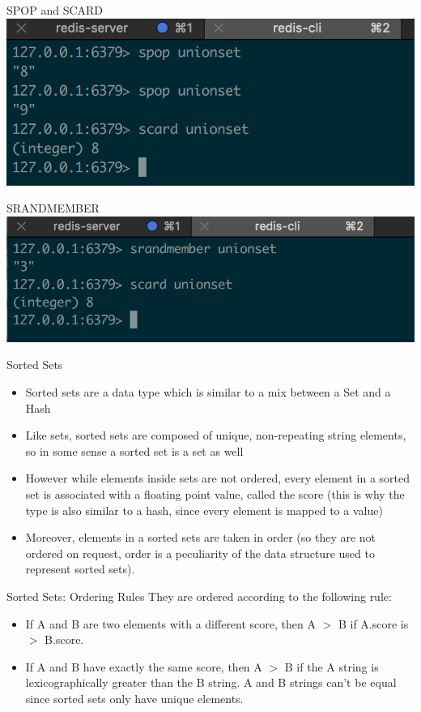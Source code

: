 \documentclass[10pt]{beamer}
\begin{document}
\begin{frame}[fragile]{SPOP and SCARD}
  \includegraphics[scale=0.7]{img/spop-scard}
\end{frame}

\begin{frame}[fragile]{SRANDMEMBER}
  \includegraphics[scale=0.7]{img/srandmember}
\end{frame}

\begin{frame}[fragile]{Sorted Sets}
  \begin{itemize}
    \item Sorted sets are a data type which is similar to a mix between a Set
    and a Hash
    \item Like sets, sorted sets are composed of unique, non-repeating string
    elements, so in some sense a sorted set is a set as well
    \item However while elements inside sets are not ordered, every element in
    a sorted set is associated with a floating point value, called the score
    (this is why the type is also similar to a hash, since every element is
    mapped to a value)
    \item Moreover, elements in a sorted sets are taken in order (so they are
    not ordered on request, order is a peculiarity of the data structure used
    to represent sorted sets).
  \end{itemize}
\end{frame}

\begin{frame}[fragile]{Sorted Sets: Ordering Rules}
  They are ordered according to the following rule:
  \begin{itemize}
    \item If A and B are two elements with a different score, then A $>$ B if
    A.score is $>$ B.score.
    \item If A and B have exactly the same score, then A $>$ B if the A string is
    lexicographically greater than the B string. A and B strings can't be equal
    since sorted sets only have unique elements.
  \end{itemize}
\end{frame}
\end{document}
